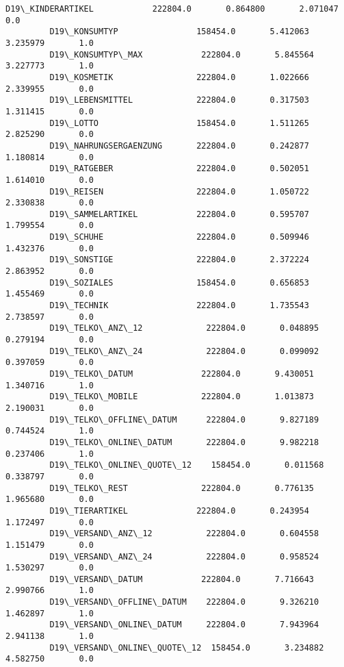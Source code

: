 \documentclass[11pt]{article}
\begin{document}
\begin{Verbatim}[commandchars=\\\{\}]
         D19\_KINDERARTIKEL            222804.0       0.864800       2.071047       0.0   
         D19\_KONSUMTYP                158454.0       5.412063       3.235979       1.0   
         D19\_KONSUMTYP\_MAX            222804.0       5.845564       3.227773       1.0   
         D19\_KOSMETIK                 222804.0       1.022666       2.339955       0.0   
         D19\_LEBENSMITTEL             222804.0       0.317503       1.311415       0.0   
         D19\_LOTTO                    158454.0       1.511265       2.825290       0.0   
         D19\_NAHRUNGSERGAENZUNG       222804.0       0.242877       1.180814       0.0   
         D19\_RATGEBER                 222804.0       0.502051       1.614010       0.0   
         D19\_REISEN                   222804.0       1.050722       2.330838       0.0   
         D19\_SAMMELARTIKEL            222804.0       0.595707       1.799554       0.0   
         D19\_SCHUHE                   222804.0       0.509946       1.432376       0.0   
         D19\_SONSTIGE                 222804.0       2.372224       2.863952       0.0   
         D19\_SOZIALES                 158454.0       0.656853       1.455469       0.0   
         D19\_TECHNIK                  222804.0       1.735543       2.738597       0.0   
         D19\_TELKO\_ANZ\_12             222804.0       0.048895       0.279194       0.0   
         D19\_TELKO\_ANZ\_24             222804.0       0.099092       0.397059       0.0   
         D19\_TELKO\_DATUM              222804.0       9.430051       1.340716       1.0   
         D19\_TELKO\_MOBILE             222804.0       1.013873       2.190031       0.0   
         D19\_TELKO\_OFFLINE\_DATUM      222804.0       9.827189       0.744524       1.0   
         D19\_TELKO\_ONLINE\_DATUM       222804.0       9.982218       0.237406       1.0   
         D19\_TELKO\_ONLINE\_QUOTE\_12    158454.0       0.011568       0.338797       0.0   
         D19\_TELKO\_REST               222804.0       0.776135       1.965680       0.0   
         D19\_TIERARTIKEL              222804.0       0.243954       1.172497       0.0   
         D19\_VERSAND\_ANZ\_12           222804.0       0.604558       1.151479       0.0   
         D19\_VERSAND\_ANZ\_24           222804.0       0.958524       1.530297       0.0   
         D19\_VERSAND\_DATUM            222804.0       7.716643       2.990766       1.0   
         D19\_VERSAND\_OFFLINE\_DATUM    222804.0       9.326210       1.462897       1.0   
         D19\_VERSAND\_ONLINE\_DATUM     222804.0       7.943964       2.941138       1.0   
         D19\_VERSAND\_ONLINE\_QUOTE\_12  158454.0       3.234882       4.582750       0.0   

\end{Verbatim}
\end{document}
